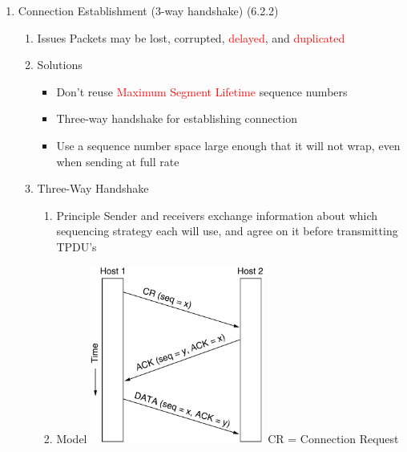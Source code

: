\documentclass[a4paper,10pt]{article}
\newcommand{\red}[1]{\textcolor{red}{#1}}
\begin{document}
\begin{enumerate}
  \item Connection Establishment (3-way handshake) (6.2.2)
    \begin{enumerate}
      \item Issues
        \newline Packets may be lost, corrupted, \red{delayed}, and \red{duplicated}
      \item Solutions
        \begin{itemize}
          \item Don't reuse \red{Maximum Segment Lifetime} sequence numbers
          \item Three-way handshake for establishing connection
          \item Use a sequence number space large enough that it will not wrap, even when sending at full rate
        \end{itemize}
      \item Three-Way Handshake
        \begin{enumerate}
          \item Principle
            \newline Sender and receivers exchange information about which sequencing strategy each will use, and agree on it before transmitting TPDU's
          \item Model
            \newline\includegraphics[width=0.50\textwidth]{3way}
            \newline CR = Connection Request
        \end{enumerate}
    \end{enumerate}


\end{enumerate}
\end{document}
